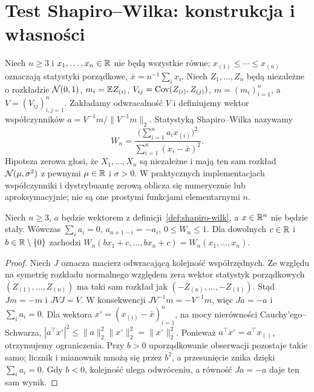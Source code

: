 \section{Test Shapiro--Wilka: konstrukcja i własności}
\begin{definicja}\label{def:shapiro-wilk}
Niech $n\ge3$ i $x_1,\ldots,x_n\in\mathbb R$ nie będą wszystkie równe; $x_{(1)}\le\cdots\le x_{(n)}$ oznaczają statystyki porządkowe, $\bar x=n^{-1}\sum_i x_i$. Niech $Z_1,\ldots,Z_n$ będą niezależne o rozkładzie $\mathcal N(0,1)$, $m_i=\mathbb E Z_{(i)}$, $V_{ij}=\operatorname{Cov}(Z_{(i)},Z_{(j)})$, $m=(m_i)_{i=1}^n$, a $V=(V_{ij})_{i,j=1}^n$. Zakładamy odwracalność $V$ i definiujemy wektor współczynników $a=V^{-1}m/\|V^{-1}m\|_2$. Statystyką Shapiro--Wilka nazywamy
\[
 W_n=\frac{\bigl(\sum_{i=1}^n a_i x_{(i)}\bigr)^2}{\sum_{i=1}^n(x_i-\bar x)^2}.
\]
Hipoteza zerowa głosi, że $X_1,\ldots,X_n$ są niezależne i mają ten sam rozkład $\mathcal N(\mu,\sigma^2)$ z pewnymi $\mu\in\mathbb R$ i $\sigma>0$. W praktycznych implementacjach współczynniki i dystrybuantę zerową oblicza się numerycznie lub aproksymacyjnie; nie są one prostymi funkcjami elementarnymi $n$.
\end{definicja}

\begin{twierdzenie}\label{thm:shapiro-properties}
Niech $n\ge3$, $a$ będzie wektorem z definicji~\ref{def:shapiro-wilk}, a $x\in\mathbb R^n$ nie będzie stały. Wówczas $\sum_i a_i=0$, $a_{n+1-i}=-a_i$, $0\le W_n\le1$. Dla dowolnych $c\in\mathbb R$ i $b\in\mathbb R\setminus\{0\}$ zachodzi $W_n(bx_1+c,\ldots,bx_n+c)=W_n(x_1,\ldots,x_n)$.
\end{twierdzenie}
\begin{proof}
Niech $J$ oznacza macierz odwracającą kolejność współrzędnych. Ze względu na symetrię rozkładu normalnego względem zera wektor statystyk porządkowych $(Z_{(1)},\ldots,Z_{(n)})$ ma taki sam rozkład jak $(-Z_{(n)},\ldots,-Z_{(1)})$. Stąd $Jm=-m$ i $JVJ=V$. W konsekwencji $JV^{-1}m=-V^{-1}m$, więc $Ja=-a$ i $\sum_i a_i=0$. Dla wektora $x^\circ=(x_{(i)}-\bar x)_{i=1}^n$, na mocy nierówności Cauchy'ego--Schwarza, $|a^\top x^\circ|^2\le\|a\|_2^2\|x^\circ\|_2^2=\|x^\circ\|_2^2$. Ponieważ $a^\top x^\circ=a^\top x_{()}$, otrzymujemy ograniczenia. Przy $b>0$ uporządkowanie obserwacji pozostaje takie samo; licznik i mianownik mnożą się przez $b^2$, a przesunięcie znika dzięki $\sum_i a_i=0$. Gdy $b<0$, kolejność ulega odwróceniu, a równość $Ja=-a$ daje ten sam wynik.
\end{proof}

